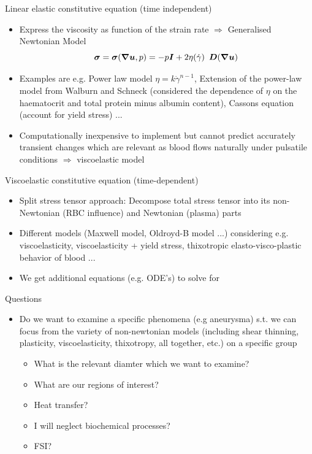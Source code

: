 \documentclass{beamer}
\begin{document}
	
		\begin{frame}{Linear elastic constitutive equation (time independent)}
		\begin{itemize}
			\item Express the viscosity
as function of the strain rate $\Rightarrow$ Generalised Newtonian Model 
			\begin{equation}
			    \bm{\sigma} = \bm{\sigma}(\grad\bm{u},p)= -p\bm{I} +2\eta(\Dot{\gamma})\hspace{5pt} \bm{D}(\grad\bm{u})
			\end{equation}
			\item Examples are e.g. Power law model $\eta= k\Dot{\gamma}^{n-1}$, Extension of the power-law model from Walburn and Schneck (considered the dependence of $\eta$
on the haematocrit and total protein minus albumin content), Cassons equation (account for yield stress)  ...
			\item Computationally inexpensive to implement but cannot predict accurately
transient changes which are relevant as blood flows naturally under pulsatile conditions $\Rightarrow
$ viscoelastic model
		\end{itemize}
		
	\end{frame}

	\begin{frame}{Viscoelastic constitutive equation (time-dependent)}
		\begin{itemize}
		\item Split stress tensor approach: Decompose total stress tensor into its non-Newtonian (RBC influence) and Newtonian (plasma) parts 
			\item Different models (Maxwell model, Oldroyd-B model ...) considering e.g. viscoelasticity, viscoelasticity + yield stress, thixotropic elasto-visco-plastic behavior of blood ...
			\item We get additional equations (e.g. ODE's) to solve for
		\end{itemize}
		
	\end{frame}
	
	
	
	
	
	
	\begin{frame}{Questions}
		\begin{itemize}
		\item Do we want to examine a specific phenomena (e.g aneurysma) s.t. we can
focus from the variety of non-newtonian models (including shear thinning, plasticity, viscoelasticity, thixotropy, all together, etc.) on a specific group
\begin{itemize}
    \item What is the relevant diamter which we want to examine?
    \item What are our regions of interest?
    \item Heat transfer?
    \item I will neglect biochemical processes?
    \item FSI?
\end{itemize}
		\end{itemize}
		
	\end{frame}
	
\end{document}

